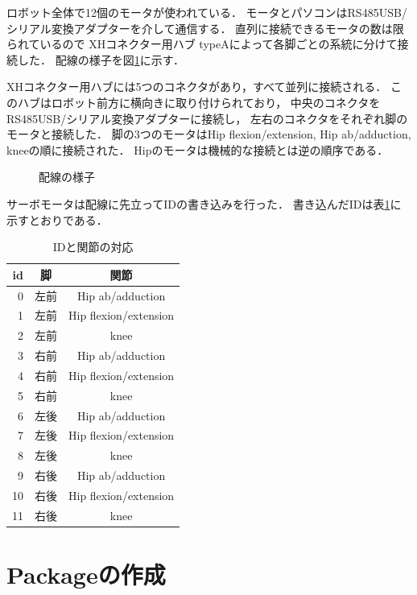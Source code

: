 \documentclass[a4paper]{jlreq}
\begin{document}
  ロボット全体で12個のモータが使われている．
  モータとパソコンはRS485USB/シリアル変換アダプターを介して通信する．
  直列に接続できるモータの数は限られているので
  XHコネクター用ハブ typeAによって各脚ごとの系統に分けて接続した．
  配線の様子を図\ref{fig:wiring}に示す．

  XHコネクター用ハブには5つのコネクタがあり，すべて並列に接続される．
  このハブはロボット前方に横向きに取り付けられており，
  中央のコネクタをRS485USB/シリアル変換アダプターに接続し，
  左右のコネクタをそれぞれ脚のモータと接続した．
  脚の3つのモータはHip flexion/extension, Hip ab/adduction, kneeの順に接続された．
  Hipのモータは機械的な接続とは逆の順序である．

  \begin{figure}[htb]
    \centering
    
    \caption{
      配線の様子
    }
    \label{fig:wiring}
  \end{figure}

  サーボモータは配線に先立ってIDの書き込みを行った．
  書き込んだIDは表\ref{table:servo_id}に示すとおりである．

  \begin{table}[htb]
    \caption{IDと関節の対応}
    \label{table:servo_id}
    \centering
    \begin{tabular}{rcc}
      \hline
      id & 脚 & 関節 \\
      \hline
      0 & 左前 & Hip ab/adduction \\
      1 & 左前 & Hip flexion/extension \\
      2 & 左前 & knee \\
      3 & 右前 & Hip ab/adduction \\
      4 & 右前 & Hip flexion/extension \\
      5 & 右前 & knee \\
      6 & 左後 & Hip ab/adduction \\
      7 & 左後 & Hip flexion/extension \\
      8 & 左後 & knee \\
      9 & 右後 & Hip ab/adduction \\
      10 & 右後 & Hip flexion/extension \\
      11 & 右後 & knee \\
      \hline
    \end{tabular}
  \end{table}

  \section{Packageの作成}
\end{document}
